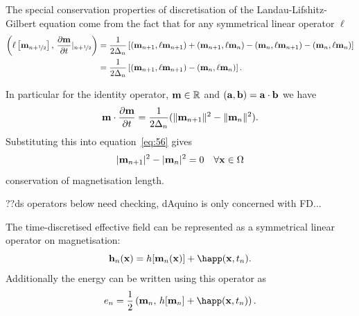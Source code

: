 The special conservation properties of \imr discretisation of the Landau-Lifshitz-Gilbert equation come from the fact that for any symmetrical linear operator $\ell$
\begin{align}
  \label{eq:54}
  \left(\ell \left[ \mathbf{m}_{n+\nicefrac{1}{2}} \right],\,  \frac{\partial \mathbf{m}}{\partial t} \lvert_{n+\nicefrac{1}{2}} \right)
  &= \frac{1}{2\Delta_{n}} \left[
    (\mathbf{m}_{n+1} , \ell \mathbf{m}_{n+1})
    + (\mathbf{m}_{n+1} , \ell \mathbf{m}_{n})
    - (\mathbf{m}_{n} , \ell \mathbf{m}_{n+1})
    - (\mathbf{m}_{n} , \ell \mathbf{m}_{n})
    \right] \notag\\
  &= \frac{1}{2\Delta_{n}} \left[
    (\mathbf{m}_{n+1} , \ell \mathbf{m}_{n+1})
    - (\mathbf{m}_{n} , \ell \mathbf{m}_{n})
    \right].
\end{align}

In particular for the identity operator, $\mathbf{m} \in \mathbb{R}$ and $({\mathbf{a}}, {\mathbf{b}}) = {\mathbf{a}} \cdot {\mathbf{b}}$ we have
\begin{equation}
  \label{eq:52}
  \mathbf{m} \cdot \frac{\partial \mathbf{m}}{\partial t}  = \frac{1}{2\Delta_{n}} (\lVert \mathbf{m}_{n+1} \rVert^2 - \lVert \mathbf{m}_{n} \rVert^2 ).
\end{equation}
Substituting this into equation~\eqref{eq:56} gives
\begin{equation}
  \lvert \mathbf{m}_{n+1}  \rvert^2 - \lvert \mathbf{m}_{n} \rvert^2 = 0 \quad \forall \mathbf{x} \in \Omega
\end{equation}
\ie conservation of magnetisation length.

??ds operators below need checking, dAquino is only concerned with FD...

The time-discretised effective field can be represented as a symmetrical linear operator on magnetisation:\cite{DAquino2005}
\begin{equation}
  \label{eq:hop}
  \hv_n(\xv) = \hop [\mv_n(\xv)] + \happ(\xv, t_n).
\end{equation}
Additionally the energy can be written using this operator as
\begin{equation}
  \label{eq:energy-hop}
  \e_n = \frac{1}{2} \ip{\mv_n}{\hop[\mv_n] + \happ(\xv,t_n)}.
\end{equation}

